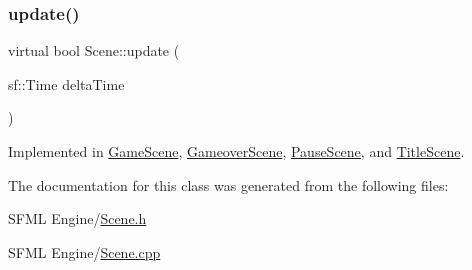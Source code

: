 \mbox{\label{class_scene_a72683c984a1da2ce4f757705e93730f2}} 
\subsubsection{\texorpdfstring{update()}{update()}}
{\footnotesize\ttfamily virtual bool Scene\+::update (\begin{DoxyParamCaption}\item[{sf\+::\+Time}]{delta\+Time }\end{DoxyParamCaption})\hspace{0.3cm}{\ttfamily [pure virtual]}}



Implemented in \hyperlink{class_game_scene_ae54628d2f041bcad66242584b2db10d6}{Game\+Scene}, \hyperlink{class_gameover_scene_a6b7f650af840f54c78b4fb1cdf2010df}{Gameover\+Scene}, \hyperlink{class_pause_scene_a8504260009b4dfb2380785e938e60b4b}{Pause\+Scene}, and \hyperlink{class_title_scene_a17ce1b5b9f6f8ca44a6ed3326e9e5d0a}{Title\+Scene}.



The documentation for this class was generated from the following files\+:\begin{DoxyCompactItemize}
\item 
S\+F\+M\+L Engine/\hyperlink{_scene_8h}{Scene.\+h}\item 
S\+F\+M\+L Engine/\hyperlink{_scene_8cpp}{Scene.\+cpp}\end{DoxyCompactItemize}
